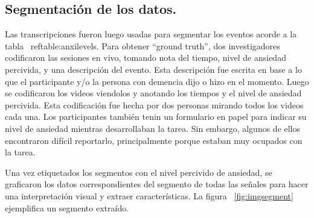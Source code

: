 \subsection{Segmentaci\'on de los datos.}\label{secc:datasegmentation}
Las transcripciones fueron luego usadas para segmentar los eventos acorde a la tabla ~ref{table:anxilevels}.
Para obtener ``ground truth'', dos investigadores codificaron las sesiones en vivo, tomando nota del tiempo, nivel de ansiedad percivida, y una descripci\'on del evento. Esta descripci\'on fue escrita en base a lo que el participante y/o la persona con demencia dijo o hizo en el momento. Luego se codificaron los videos viendolos y anotando los tiempos y el nivel de ansiedad percivida. Esta codificaci\'on fue hecha por dos personas mirando todos los videos cada una. Los participantes tambi\'en tenin un formulario en papel para indicar su nivel de ansiedad mientras desarrollaban la tarea. Sin embargo, algunos de ellos encontraron dif\'icil reportarlo, principalmente porque estaban muy ocupados con la tarea.


Una vez etiquetados los segmentos con el nivel percivido de ansiedad, se graficaron los datos correspondientes del segmento de todas las se\~nales para hacer una interpretaci\'on visual y extraer caracter\'isticas. La figura ~\ref{fig:imgsegment} ejemplifica un segmento extra\'ido.

